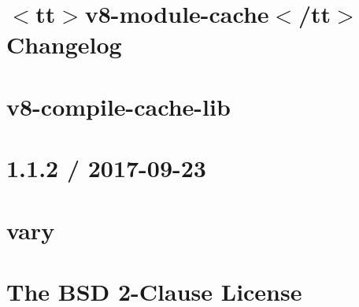 \documentclass[twoside]{book}
\newcommand{\+}{\discretionary{\mbox{\scriptsize$\hookleftarrow$}}{}{}}
\begin{document}
\chapter{\texorpdfstring{$<$}{<}tt\texorpdfstring{$>$}{>}v8-\/module-\/cache\texorpdfstring{$<$}{<}/tt\texorpdfstring{$>$}{>} Changelog}
\label{md__c___users_vaishnavi_jadhav__desktop__developer_code_mean_stack_example_server_node_modules_v59a9ad7dfadae552941ec97f38bc6f17}

\chapter{v8-\/compile-\/cache-\/lib}
\label{md__c___users_vaishnavi_jadhav__desktop__developer_code_mean_stack_example_server_node_modules_vc272723e9e12abe86256008340a859a1}

\chapter{1.1.2 / 2017-\/09-\/23}
\label{md__c___users_vaishnavi_jadhav__desktop__developer_code_mean_stack_example_server_node_modules_vary__h_i_s_t_o_r_y}

\chapter{vary}
\label{md__c___users_vaishnavi_jadhav__desktop__developer_code_mean_stack_example_server_node_modules_vary__r_e_a_d_m_e}

\chapter{The BSD 2-\/Clause License}
\label{md__c___users_vaishnavi_jadhav__desktop__developer_code_mean_stack_example_server_node_modules_wa0f0bf8fa89e7f22cf8cbece7a23a16e}

\end{document}

